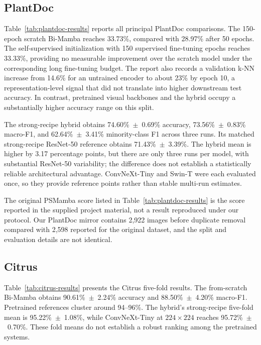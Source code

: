 \documentclass[conference]{IEEEtran}
\begin{document}
\subsection{PlantDoc}
Table~\ref{tab:plantdoc-results} reports all principal PlantDoc comparisons. The 150-epoch scratch Bi-Mamba reaches 33.73\%, compared with 28.97\% after 50 epochs. The self-supervised initialization with 150 supervised fine-tuning epochs reaches 33.33\%, providing no measurable improvement over the scratch model under the corresponding long fine-tuning budget. The report also records a validation k-NN increase from 14.6\% for an untrained encoder to about 23\% by epoch 10, a representation-level signal that did not translate into higher downstream test accuracy. In contrast, pretrained visual backbones and the hybrid occupy a substantially higher accuracy range on this split.
\PlantDocResultsTable

The strong-recipe hybrid obtains 74.60\%~$\pm$~0.69\% accuracy, 73.56\%~$\pm$~0.83\% macro-F1, and 62.64\%~$\pm$~3.41\% minority-class F1 across three runs. Its matched strong-recipe ResNet-50 reference obtains 71.43\%~$\pm$~3.39\%. The hybrid mean is higher by 3.17 percentage points, but there are only three runs per model, with substantial ResNet-50 variability; the difference does not establish a statistically reliable architectural advantage. ConvNeXt-Tiny and Swin-T were each evaluated once, so they provide reference points rather than stable multi-run estimates.

The original PSMamba score listed in Table~\ref{tab:plantdoc-results} is the score reported in the supplied project material, not a result reproduced under our protocol. Our PlantDoc mirror contains 2,922 images before duplicate removal compared with 2,598 reported for the original dataset, and the split and evaluation details are not identical.

\subsection{Citrus}
Table~\ref{tab:citrus-results} presents the Citrus five-fold results. The from-scratch Bi-Mamba obtains 90.61\%~$\pm$~2.24\% accuracy and 88.50\%~$\pm$~4.20\% macro-F1. Pretrained references cluster around 94--96\%. The hybrid's strong-recipe five-fold mean is 95.22\%~$\pm$~1.08\%, while ConvNeXt-Tiny at $224\times224$ reaches 95.72\%~$\pm$~0.70\%. These fold means do not establish a robust ranking among the pretrained systems.
\CitrusResultsTable
\end{document}
